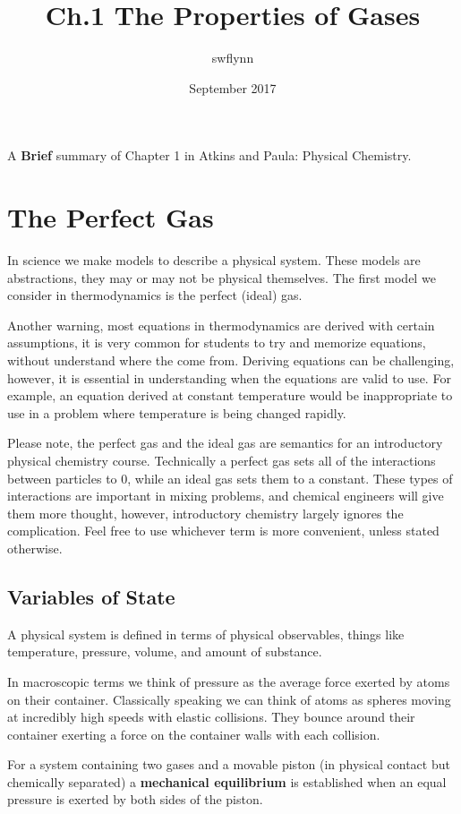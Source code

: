 \documentclass{article}
\title{Ch.1 The Properties of Gases}
\author{swflynn }
\date{September 2017}
\begin{document}
\maketitle

A \textbf{Brief} summary of Chapter 1 in Atkins and Paula: Physical Chemistry. 

\section*{The Perfect Gas}
In science we make models to describe a physical system. 
These models are abstractions, they may or may not be physical themselves. 
The first model we consider in thermodynamics is the perfect (ideal) gas.

Another warning, most equations in thermodynamics are derived with certain assumptions, it is very common for students to try and memorize equations, without understand where the come from. 
Deriving equations can be challenging, however, it is essential in understanding when the equations are valid to use. 
For example, an equation derived at constant temperature would be inappropriate to use in a problem where temperature is being changed rapidly. 

Please note, the perfect gas and the ideal gas are semantics for an introductory physical chemistry course.
Technically a perfect gas sets all of the interactions between particles to 0, while an ideal gas sets them to a constant. 
These types of interactions are important in mixing problems, and chemical engineers will give them more thought, however, introductory chemistry largely ignores the complication. 
Feel free to use whichever term is more convenient, unless stated otherwise. 

\subsection*{Variables of State}
A physical system is defined in terms of physical observables, things like temperature, pressure, volume, and amount of substance. 

In macroscopic terms we think of pressure as the average force exerted by atoms on their container. 
Classically speaking we can think of atoms as spheres moving at incredibly high speeds with elastic collisions.
They bounce around their container exerting a force on the container walls with each collision. 

For a system containing two gases and a movable piston (in physical contact but chemically separated) a \textbf{mechanical equilibrium} is established when an equal pressure is exerted by both sides of the piston.
\end{document}
